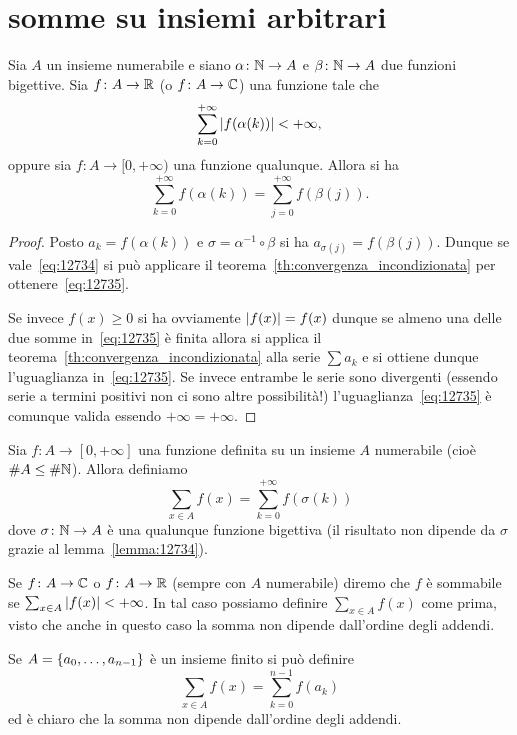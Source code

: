 \section{somme su insiemi arbitrari}
%
%

\begin{lemma}\label{lemma:12734}
  Sia $A$ un insieme numerabile e siano 
  $\alpha\colon {\mathbb N}\to A$ e $\beta\colon {\mathbb N}\to A$ 
  due funzioni bigettive.
  Sia $f\colon A\to {\mathbb R}$ (o 
  $f\colon A \to {\mathbb C}$) una funzione tale che 
  \begin{equation}\label{eq:12734}
    \sum_{k=0}^{+\infty} {\left|f(\alpha(k))\right|} < +\infty,  
  \end{equation}
  oppure sia $f\colon A\to [0,+\infty)$ una funzione 
  qualunque. 
  Allora si ha
  \begin{equation}\label{eq:12735}
    \sum_{k=0}^{+\infty} f(\alpha(k)) =
    \sum_{j=0}^{+\infty} f(\beta(j)). 
  \end{equation}
\end{lemma}
%
\begin{proof}
Posto $a_k=f(\alpha (k))$ e $\sigma = \alpha^{-1}\circ \beta$ si ha 
$a_{\sigma(j)} = f(\beta (j))$.
Dunque se vale~\eqref{eq:12734} si può 
applicare il teorema~\ref{th:convergenza_incondizionata}
per ottenere~\eqref{eq:12735}.

Se invece $f(x)\ge 0$ si ha ovviamente ${\left|f(x)\right|}=f(x)$
dunque se almeno una delle due somme in~\eqref{eq:12735}
è finita allora si applica il teorema~\ref{th:convergenza_incondizionata}
alla serie $\sum a_k$ e si ottiene dunque l'uguaglianza 
in~\eqref{eq:12735}.
Se invece entrambe le serie sono divergenti
(essendo serie a termini positivi non ci sono altre possibilità!)
l'uguaglianza~\eqref{eq:12735} è comunque valida
essendo $+\infty = +\infty$.
\end{proof}

\begin{definition}
Sia $f\colon A\to [0,+\infty]$ una funzione definita su un insieme 
$A$ numerabile (cioè $\#A \le \#{\mathbb N}$).
Allora definiamo
  \[
    \sum_{x\in A}f(x)
    = \sum_{k=0}^{+\infty} f(\sigma(k)) 
  \]
dove $\sigma\colon {\mathbb N}\to A$ è una qualunque funzione bigettiva
(il risultato non dipende da $\sigma$ grazie al lemma~\ref{lemma:12734}).

Se $f\colon A\to {\mathbb C}$ o $f\colon A\to {\mathbb R}$ (sempre con $A$ numerabile)
diremo che $f$ è sommabile se $\sum_{x\in A}{\left|f(x)\right|}<+\infty$. 
In tal caso possiamo definire $\sum_{x\in A} f(x)$ come prima,
visto che anche in questo caso la somma non dipende
dall'ordine degli addendi.

Se $A={\left\{ a_0, \dots, a_{n-1} \right\}}$ è un insieme finito si può definire 
\[
  \sum_{x\in A} f(x) = \sum_{k=0}^{n-1} f(a_k)
\]
ed è chiaro che la somma non dipende dall'ordine degli addendi.
\end{definition}

